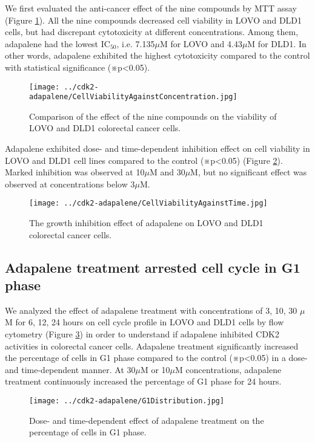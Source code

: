 We first evaluated the anti-cancer effect of the nine compounds by MTT assay (Figure \ref{cdk2:CellViabilityAgainstConcentration}). All the nine compounds decreased cell viability in LOVO and DLD1 cells, but had discrepant cytotoxicity at different concentrations. Among them, adapalene had the lowest IC$_{50}$, i.e. 7.135$\mu$M for LOVO and 4.43$\mu$M for DLD1. In other words, adapalene exhibited the highest cytotoxicity compared to the control with statistical significance (※p<0.05).

\begin{figure}
\centering
\texttt{[image: ../cdk2-adapalene/CellViabilityAgainstConcentration.jpg]}
\caption{Comparison of the effect of the nine compounds on the viability of LOVO and DLD1 colorectal cancer cells.}
\label{cdk2:CellViabilityAgainstConcentration}
\end{figure}

Adapalene exhibited dose- and time-dependent inhibition effect on cell viability in LOVO and DLD1 cell lines compared to the control (※p<0.05) (Figure \ref{cdk2:CellViabilityAgainstTime}). Marked inhibition was observed at 10$\mu$M and 30$\mu$M, but no significant effect was observed at concentrations below 3$\mu$M.

\begin{figure}
\centering
\texttt{[image: ../cdk2-adapalene/CellViabilityAgainstTime.jpg]}
\caption{The growth inhibition effect of adapalene on LOVO and DLD1 colorectal cancer cells.}
\label{cdk2:CellViabilityAgainstTime}
\end{figure}

\subsection{Adapalene treatment arrested cell cycle in G1 phase}

We analyzed the effect of adapalene treatment with concentrations of 3, 10, 30 $\mu$M for 6, 12, 24 hours on cell cycle profile in LOVO and DLD1 cells by flow cytometry (Figure \ref{cdk2:G1Distribution}) in order to understand if adapalene inhibited CDK2 activities in colorectal cancer cells. Adapalene treatment significantly increased the percentage of cells in G1 phase compared to the control (※p<0.05) in a dose- and time-dependent manner. At 30$\mu$M or 10$\mu$M concentrations, adapalene treatment continuously increased the percentage of G1 phase for 24 hours.

\begin{figure}
\centering
\texttt{[image: ../cdk2-adapalene/G1Distribution.jpg]}
\caption{Dose- and time-dependent effect of adapalene treatment on the percentage of cells in G1 phase.}
\label{cdk2:G1Distribution}
\end{figure}

